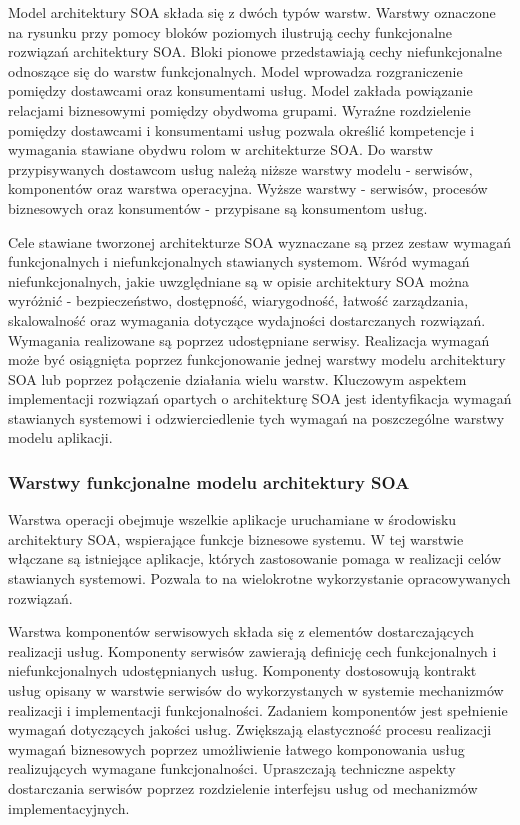 		Model architektury SOA składa się z dwóch typów warstw. Warstwy oznaczone na rysunku przy pomocy bloków poziomych ilustrują cechy funkcjonalne rozwiązań architektury SOA. Bloki pionowe przedstawiają cechy niefunkcjonalne odnoszące się do warstw funkcjonalnych. Model wprowadza rozgraniczenie pomiędzy dostawcami oraz konsumentami usług. Model zakłada powiązanie relacjami biznesowymi pomiędzy obydwoma grupami. Wyraźne rozdzielenie pomiędzy dostawcami i konsumentami usług pozwala określić kompetencje i wymagania stawiane obydwu rolom w architekturze SOA. Do warstw przypisywanych dostawcom usług należą niższe warstwy modelu - serwisów, komponentów oraz warstwa operacyjna. Wyższe warstwy - serwisów, procesów biznesowych oraz konsumentów - przypisane są konsumentom usług. 

		Cele stawiane tworzonej architekturze SOA wyznaczane są przez zestaw wymagań funkcjonalnych i niefunkcjonalnych stawianych systemom. Wśród wymagań niefunkcjonalnych, jakie uwzględniane są w opisie architektury SOA można wyróżnić - bezpieczeństwo, dostępność, wiarygodność, łatwość zarządzania, skalowalność oraz wymagania dotyczące wydajności dostarczanych rozwiązań. Wymagania realizowane są poprzez udostępniane serwisy. Realizacja wymagań może być osiągnięta poprzez funkcjonowanie jednej warstwy modelu architektury SOA lub poprzez połączenie działania wielu warstw. Kluczowym aspektem implementacji rozwiązań opartych o architekturę SOA jest identyfikacja wymagań stawianych systemowi i odzwierciedlenie tych wymagań na poszczególne warstwy modelu aplikacji. 

		\subsubsection{Warstwy funkcjonalne modelu architektury SOA}


			Warstwa operacji obejmuje wszelkie aplikacje uruchamiane w środowisku architektury SOA, wspierające funkcje biznesowe systemu. W tej warstwie włączane są istniejące aplikacje, których zastosowanie pomaga w realizacji celów stawianych systemowi. Pozwala to na wielokrotne wykorzystanie opracowywanych rozwiązań\cite{Arsanjani07}. 

			Warstwa komponentów serwisowych składa się z elementów dostarczających realizacji usług. Komponenty serwisów zawierają definicję cech funkcjonalnych i niefunkcjonalnych udostępnianych usług. Komponenty dostosowują kontrakt usług opisany w warstwie serwisów do wykorzystanych w systemie mechanizmów realizacji i implementacji funkcjonalności. Zadaniem komponentów jest spełnienie wymagań dotyczących jakości usług. Zwiększają elastyczność procesu realizacji wymagań biznesowych poprzez umożliwienie łatwego komponowania usług realizujących wymagane funkcjonalności. Upraszczają techniczne aspekty dostarczania serwisów poprzez rozdzielenie interfejsu usług od mechanizmów implementacyjnych.

